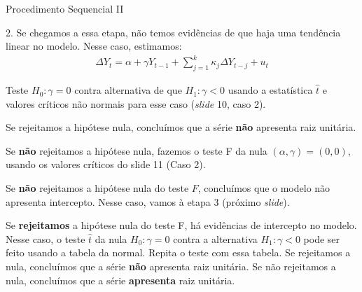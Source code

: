 \documentclass[11pt]{beamer}
\newenvironment{halfwideenumerate}{\enumerate\addtolength{\itemsep}{0.5em}}{\endenumerate}
\begin{document}
\begin{frame}{Procedimento Sequencial II}

		
		{ 2.} Se chegamos a essa etapa, não temos evidências de que haja uma tendência linear no modelo. Nesse caso, estimamos:
		\begin{equation*}
			\begin{aligned}
				\Delta Y_t = \alpha  + \gamma Y_{t-1}  +\sum_{j=1}^k \kappa_j \Delta Y_{t-j} + u_t
			\end{aligned}
		\end{equation*}
		
		Teste $H_0: \gamma = 0$ contra alternativa de que $H_1: \gamma < 0$ usando a estatística $\hat{t}$ e valores críticos não normais para esse caso (\textit{slide} 10, caso 2).
		\begin{halfwideenumerate}
			\small 
			\item[2.1] Se rejeitamos a hipótese nula, concluímos que a série \textbf{não} apresenta raiz unitária.
			\item[2.2] Se \textbf{não} rejeitamos a hipótese nula, fazemos o teste F da nula $(\alpha, \gamma)=(0,0)$, usando os valores críticos do slide 11 (Caso 2).
			\begin{halfwideenumerate}
				\footnotesize
				\item[2.2.1] Se \textbf{não} rejeitamos a hipótese  nula do teste $F$, concluímos que o modelo não apresenta intercepto. Nesse caso, vamos à etapa 3 (próximo \textit{slide}).
				\item[2.2.2] Se \textbf{rejeitamos} a hipótese nula do teste F, há evidências de intercepto no modelo. Nesse caso, o teste $\hat{t}$ da nula $H_0: \gamma = 0$ contra a alternativa  $H_1: \gamma < 0$ pode ser feito usando a tabela da normal. Repita o teste com essa tabela. Se rejeitamos a nula, concluímos que a série \textbf{não} apresenta raiz unitária. Se não rejeitamos a nula, concluímos que a série \textbf{apresenta} raiz unitária.
			\end{halfwideenumerate}
		\end{halfwideenumerate}
		

	
\end{frame}
\end{document}
